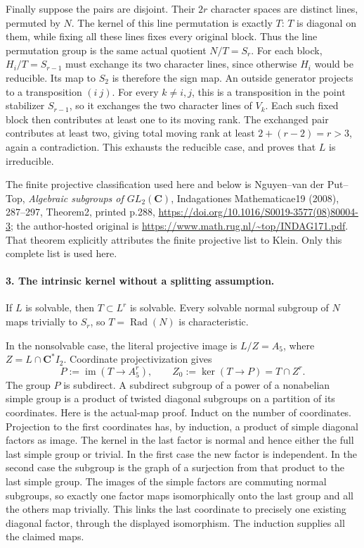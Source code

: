 Finally suppose the pairs are disjoint. Their \(2r\)
character spaces are distinct lines, permuted by \(N\).
The kernel of this line permutation is exactly \(T\):
\(T\) is diagonal on them, while fixing all these lines
fixes every original block. Thus the line permutation
group is the same actual quotient \(N/T=S_r\).
For each block, \(H_i/T=S_{r-1}\) must exchange its
two character lines, since otherwise \(H_i\) would be
reducible. Its map to \(S_2\) is therefore the sign map.
An outside generator projects to a transposition \((i\ j)\).
For every \(k\ne i,j\), this is a transposition in the
point stabilizer \(S_{r-1}\), so it exchanges the two
character lines of \(V_k\). Each such fixed block then
contributes at least one to its moving rank. The exchanged
pair contributes at least two, giving total moving rank
at least \(2+(r-2)=r>3\), again a contradiction.
This exhausts the reducible case, and proves that \(L\)
is irreducible.

The finite projective classification used here and below is
Nguyen--van der Put--Top, \emph{Algebraic subgroups of
\(GL_2(\mathbf C)\)}, Indagationes Mathematicae19 (2008),
287--297, Theorem2, printed p.288,
\url{https://doi.org/10.1016/S0019-3577(08)80004-3};
the author-hosted original is
\url{https://www.math.rug.nl/~top/INDAG171.pdf}.
That theorem explicitly attributes the finite projective
list to Klein. Only this complete list is used here.

\paragraph{3. The intrinsic kernel without a splitting assumption.}
If \(L\) is solvable, then \(T\subset L^r\) is
solvable. Every solvable normal subgroup of \(N\) maps
trivially to \(S_r\), so
\(T=\operatorname{Rad}(N)\) is characteristic.

In the nonsolvable case, the literal projective image is
\(L/Z=A_5\), where \(Z=L\cap\mathbf C^*I_2\).
Coordinate projectivization gives
\[
 P:=\operatorname{im}(T\longrightarrow A_5^r),\qquad
 Z_0:=\ker(T\longrightarrow P)=T\cap Z^r.
 \tag{S47.3}
\]
The group \(P\) is subdirect. A subdirect subgroup of a
power of a nonabelian simple group is a product of twisted
diagonal subgroups on a partition of its coordinates.
Here is the actual-map proof. Induct on the number of
coordinates. Projection to the first coordinates has,
by induction, a product of simple diagonal factors as
image. The kernel in the last factor is normal and hence
either the full last simple group or trivial. In the first
case the new factor is independent. In the second case
the subgroup is the graph of a surjection from that product
to the last simple group. The images of the simple factors
are commuting normal subgroups, so exactly one factor
maps isomorphically onto the last group and all the others
map trivially. This links the last coordinate to precisely
one existing diagonal factor, through the displayed
isomorphism. The induction supplies all the claimed maps.

